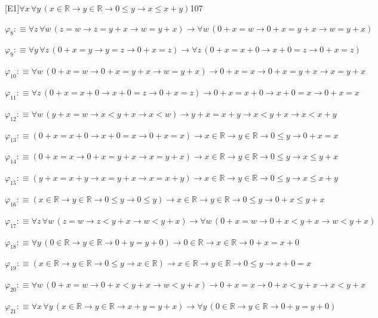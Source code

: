 \begin{fullproof}{[E1]}{$\forall x\,\forall y\,(x \in \mathbb{R} \to y \in \mathbb{R} \to 0 \leq y \to x \leq x + y)$}{107}
\begin{abbrevlist}
\item $\varphi_{8} :\equiv \forall z\,\forall w\,(z = w \to z = y + x \to w = y + x) \to \forall w\,(0 + x = w \to 0 + x = y + x \to w = y + x)$
\item $\varphi_{9} :\equiv \forall y\,\forall z\,(0 + x = y \to y = z \to 0 + x = z) \to \forall z\,(0 + x = x + 0 \to x + 0 = z \to 0 + x = z)$
\item $\varphi_{10} :\equiv \forall w\,(0 + x = w \to 0 + x = y + x \to w = y + x) \to 0 + x = x \to 0 + x = y + x \to x = y + x$
\item $\varphi_{11} :\equiv \forall z\,(0 + x = x + 0 \to x + 0 = z \to 0 + x = z) \to 0 + x = x + 0 \to x + 0 = x \to 0 + x = x$
\item $\varphi_{12} :\equiv \forall w\,(y + x = w \to x < y + x \to x < w) \to y + x = x + y \to x < y + x \to x < x + y$
\item $\varphi_{13} :\equiv (0 + x = x + 0 \to x + 0 = x \to 0 + x = x) \to x \in \mathbb{R} \to y \in \mathbb{R} \to 0 \leq y \to 0 + x = x$
\item $\varphi_{14} :\equiv (0 + x = x \to 0 + x = y + x \to x = y + x) \to x \in \mathbb{R} \to y \in \mathbb{R} \to 0 \leq y \to x \leq y + x$
\item $\varphi_{15} :\equiv (y + x = x + y \to x = y + x \to x = x + y) \to x \in \mathbb{R} \to y \in \mathbb{R} \to 0 \leq y \to x \leq x + y$
\item $\varphi_{16} :\equiv (x \in \mathbb{R} \to y \in \mathbb{R} \to 0 \leq y \to 0 \leq y) \to x \in \mathbb{R} \to y \in \mathbb{R} \to 0 \leq y \to 0 + x \leq y + x$
\item $\varphi_{17} :\equiv \forall z\,\forall w\,(z = w \to z < y + x \to w < y + x) \to \forall w\,(0 + x = w \to 0 + x < y + x \to w < y + x)$
\item $\varphi_{18} :\equiv \forall y\,(0 \in \mathbb{R} \to y \in \mathbb{R} \to 0 + y = y + 0) \to 0 \in \mathbb{R} \to x \in \mathbb{R} \to 0 + x = x + 0$
\item $\varphi_{19} :\equiv (x \in \mathbb{R} \to y \in \mathbb{R} \to 0 \leq y \to x \in \mathbb{R}) \to x \in \mathbb{R} \to y \in \mathbb{R} \to 0 \leq y \to x + 0 = x$
\item $\varphi_{20} :\equiv \forall w\,(0 + x = w \to 0 + x < y + x \to w < y + x) \to 0 + x = x \to 0 + x < y + x \to x < y + x$
\item $\varphi_{21} :\equiv \forall x\,\forall y\,(x \in \mathbb{R} \to y \in \mathbb{R} \to x + y = y + x) \to \forall y\,(0 \in \mathbb{R} \to y \in \mathbb{R} \to 0 + y = y + 0)$

\end{abbrevlist}
\end{fullproof}
